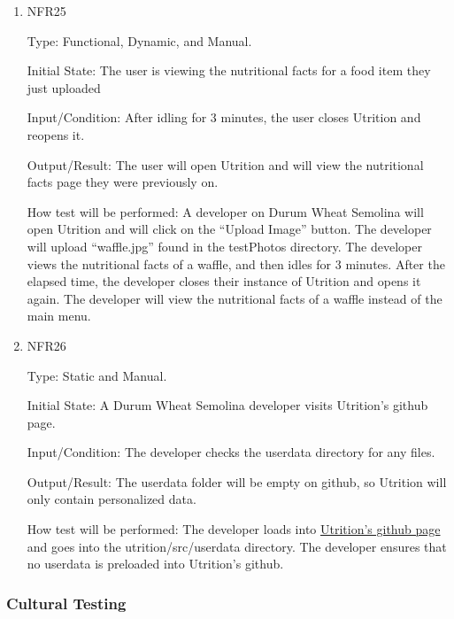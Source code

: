 \documentclass[12pt, titlepage]{article}
\begin{document}
	
	\begin{enumerate}
		
		\item{NFR25\\} 
		
		Type: Functional, Dynamic, and Manual.
		
		Initial State: The user is viewing the nutritional facts for a food item they just uploaded
		
		Input/Condition: After idling for 3 minutes, the user closes Utrition and reopens 
		it.
		
		Output/Result: The user will open Utrition and will view the nutritional facts page they were previously on.
		
		How test will be performed: A developer on Durum Wheat Semolina will open Utrition and will click on the “Upload Image” button. The developer will upload “waffle.jpg” found in the testPhotos directory. The developer views the nutritional facts of a waffle, and then idles for 3 minutes. After the elapsed time, the developer closes their instance of Utrition and opens it again. The developer will view the nutritional facts of a waffle instead of the main menu.
		
		\item{NFR26\\} 
		
		Type: Static and Manual.
		
		Initial State: A Durum Wheat Semolina developer visits Utrition’s github page.
		
		Input/Condition: The developer checks the userdata directory for any files.
		
		Output/Result: The userdata folder will be empty on github, so Utrition will only contain personalized data.
		
		How test will be performed: The developer loads into \href{https://github.com/jeff-rey-wang/utrition/}{Utrition’s github page} and goes into the utrition/src/userdata directory. The developer ensures that no userdata is preloaded into Utrition’s github.
		
		
	\end{enumerate}
	
	\subsubsection{Cultural Testing}
	
\end{document}
